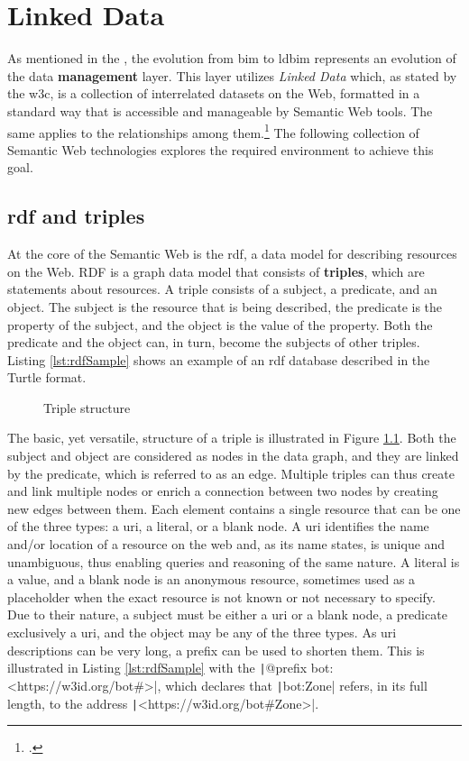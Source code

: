 \chapter{Linked Data}
As mentioned in the , the evolution from \ac{bim} to \ac{ldbim} represents an evolution of the data \textbf{management} layer. This layer utilizes \emph{Linked Data} which, as stated by the \ac{w3c}, is a collection of interrelated datasets on the Web, formatted in a standard way that is accessible and manageable by Semantic Web tools. The same applies to the relationships among them.\footcite{w3c} The following collection of Semantic Web technologies explores the required environment to achieve this goal.

\section{\acs{rdf} and triples} \label{subsec:rdfAndTriples}
At the core of the Semantic Web is the \ac{rdf}, a data model for describing resources on the Web. RDF is a graph data model that consists of \textbf{triples}, which are statements about resources. A triple consists of a subject, a predicate, and an object. The subject is the resource that is being described, the predicate is the property of the subject, and the object is the value of the property. Both the predicate and the object can, in turn, become the subjects of other triples. Listing \ref{lst:rdfSample} shows an example of an \ac{rdf} database described in the Turtle format.

\begin{figure}[H]
    \centering
    
    \caption{Triple structure}
    \label{fig:triple}
\end{figure}

The basic, yet versatile, structure of a triple is illustrated in Figure \ref{fig:triple}. Both the subject and object are considered as nodes in the data graph, and they are linked by the predicate, which is referred to as an edge. Multiple triples can thus create and link multiple nodes or enrich a connection between two nodes by creating new edges between them. Each element contains a single resource that can be one of the three types: a \acs{uri}, a literal, or a blank node. A \ac{uri} identifies the name and/or location of a resource on the web and, as its name states, is unique and unambiguous, thus enabling queries and reasoning of the same nature. A literal is a value, and a blank node is an anonymous resource, sometimes used as a placeholder when the exact resource is not known or not necessary to specify. Due to their nature, a subject must be either a \ac{uri} or a blank node, a predicate exclusively a \ac{uri}, and the object may be any of the three types. As \ac{uri} descriptions can be very long, a prefix can be used to shorten them. This is illustrated in Listing \ref{lst:rdfSample} with the \texttt|@prefix bot: <https://w3id.org/bot#>|, which declares that \texttt|bot:Zone| refers, in its full length, to the address \texttt|<https://w3id.org/bot#Zone>|.

